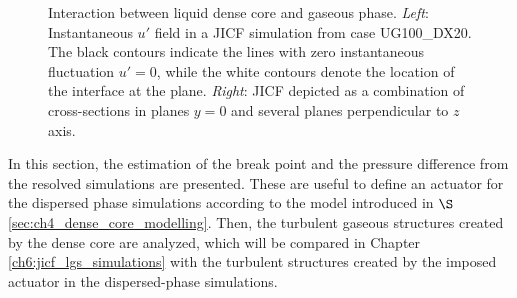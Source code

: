 
\begin{figure}[ht]
\flushleft
{}
\caption[Interaction between liquid dense core and gaseous phase.]{Interaction between liquid dense core and gaseous phase. \textsl{Left}: Instantaneous $u'$ field in a JICF simulation from case UG100\_DX20. The black contours indicate the lines with zero instantaneous fluctuation $u' = 0$, while the white contours denote the location of the interface at the plane. \textsl{Right}: JICF depicted as a combination of cross-sections in planes $y = 0$ and several planes perpendicular to $z$ axis.}
\label{fig:jet_air_interaction_up_and_skeleton}
\end{figure}

In this section, the estimation of the break point and the pressure difference from the resolved simulations are presented. These are useful to define an actuator for the dispersed phase simulations according to the model introduced in $\S$\ref{sec:ch4_dense_core_modelling}. Then, the turbulent gaseous structures created by the dense core are analyzed, which will be compared in Chapter \ref{ch6:jicf_lgs_simulations} with the turbulent structures created by the imposed actuator in the dispersed-phase simulations.



